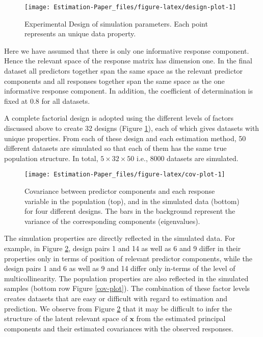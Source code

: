 \documentclass[12pt,3p,authoryear]{elsarticle}
\begin{document}
\begin{figure}
\texttt{[image: Estimation-Paper\_files/figure-latex/design-plot-1]} \caption{Experimental Design of simulation parameters. Each point represents an unique data property.}\label{fig:design-plot}
\end{figure}

Here we have assumed that there is only one informative response
component. Hence the relevant space of the response matrix has dimension
one. In the final dataset all predictors together span the same space as
the relevant predictor components and all responses together span the
same space as the one informative response component. In addition, the
coefficient of determination is fixed at 0.8 for all datasets.

A complete factorial design is adopted using the different levels of
factors discussed above to create 32 designs (Figure
\ref{fig:design-plot}), each of which gives datasets with unique
properties. From each of these design and each estimation method, 50
different datasets are simulated so that each of them has the same true
population structure. In total, \(5 \times 32 \times 50\) i.e., 8000
datasets are simulated.






\begin{figure}[H]
\texttt{[image: Estimation-Paper\_files/figure-latex/cov-plot-1]} \caption{Covariance between predictor components and each response
variable in the population (top), and in the simulated data (bottom) for
four different designs. The bars in the background represent the
variance of the corresponding components (eigenvalues).}\label{fig:cov-plot}
\end{figure}

The simulation properties are directly reflected in the simulated data.
For example, in Figure \ref{fig:cov-plot}, design pairs 1 and 14 as well
as 6 and 9 differ in their properties only in terms of position of
relevant predictor components, while the design pairs 1 and 6 as well as
9 and 14 differ only in-terms of the level of multicollinearity. The
population properties are also reflected in the simulated samples
(bottom row Figure \ref{cov-plot}). The combination of these factor
levels creates datasets that are easy or difficult with regard to
estimation and prediction. We observe from Figure \ref{fig:cov-plot}
that it may be difficult to infer the structure of the latent relevant
space of \(\mathbf{x}\) from the estimated principal components and
their estimated covariances with the observed responses.
\end{document}
